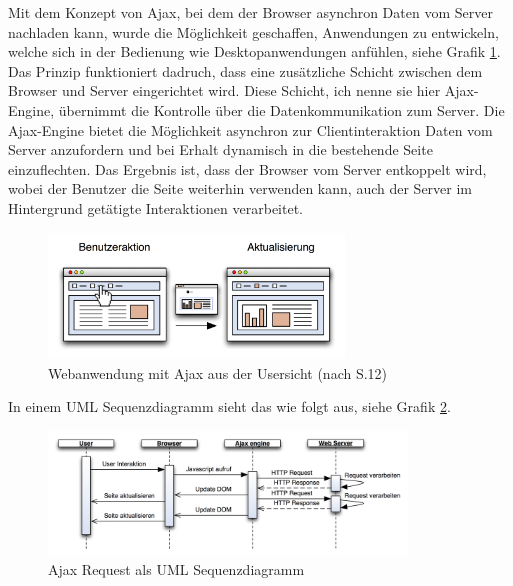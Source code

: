   Mit dem Konzept von \ac{Ajax}, bei dem der Browser asynchron Daten vom Server
  nachladen kann, wurde die Möglichkeit geschaffen, Anwendungen zu entwickeln,
  welche sich in der Bedienung wie Desktopanwendungen anfühlen, siehe Grafik
  \ref{img:ajaxPageReload}. Das Prinzip funktioniert dadruch, dass eine
  zusätzliche Schicht zwischen dem Browser und Server eingerichtet wird. Diese
  Schicht, ich nenne sie hier Ajax-Engine, übernimmt die Kontrolle über die
  Datenkommunikation zum Server. Die Ajax-Engine bietet die Möglichkeit
  asynchron zur Clientinteraktion Daten vom Server anzufordern und bei Erhalt
  dynamisch in die bestehende Seite einzuflechten. Das Ergebnis ist, dass der
  Browser vom Server entkoppelt wird, wobei der Benutzer die Seite weiterhin
  verwenden kann, auch der Server im Hintergrund getätigte Interaktionen
  verarbeitet.
  
  \begin{figure}[h]
    \begin{center}
      \includegraphics[width=0.7\textwidth]{./image/ajaxPageReload.png}
      \caption{Webanwendung mit Ajax aus der Usersicht (nach
      \cite{DiplomarbeitStephanSchuster} S.12)}
      \label{img:ajaxPageReload}
    \end{center}
  \end{figure}
  
  In einem \ac{UML} Sequenzdiagramm sieht das wie folgt aus, siehe Grafik
  \ref{img:sequenzdiagrammAjaxPageReload}.
  
  \begin{figure}[h]
    \begin{center}
      \includegraphics[width=0.85\textwidth]{./image/sequenzdiagrammAjaxPageReload.png}
      \caption{Ajax Request als \ac{UML} Sequenzdiagramm}
      \label{img:sequenzdiagrammAjaxPageReload}
    \end{center}
  \end{figure}  
  
